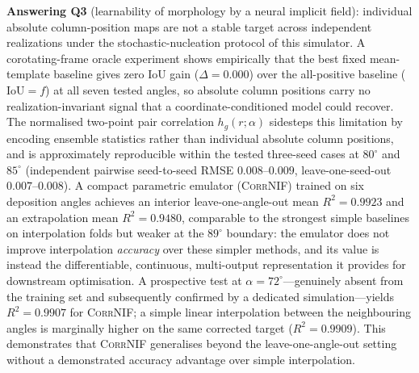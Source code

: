 \documentclass[aip,amsmath,amssymb,reprint]{revtex4-1}
\newcommand{\dang}{\ensuremath{\alpha}}
\begin{document}
\textbf{Answering Q3} (learnability of morphology by a neural implicit
field): individual absolute column-position maps are not a stable
target across independent realizations under the stochastic-nucleation
protocol of this simulator.
A corotating-frame oracle experiment shows empirically that the best
fixed mean-template baseline gives zero IoU gain ($\Delta = 0.000$) over the
all-positive baseline ($\mathrm{IoU}=f$) at all seven tested angles, so
absolute column positions carry no realization-invariant signal that a
coordinate-conditioned model could recover.
The normalised two-point pair correlation $h_g(r;\dang)$ sidesteps this
limitation by encoding ensemble statistics rather than individual
absolute column positions, and is approximately reproducible within the
tested three-seed cases at $80^{\circ}$ and $85^{\circ}$ (independent
pairwise seed-to-seed RMSE $0.008$--$0.009$, leave-one-seed-out
$0.007$--$0.008$).
A compact parametric emulator (\textsc{CorrNIF}) trained on six deposition
angles achieves an interior leave-one-angle-out mean $R^2 = 0.9923$ and an
extrapolation mean $R^2 = 0.9480$, comparable to the strongest simple
baselines on interpolation folds but weaker at the $89^{\circ}$ boundary:
the emulator does not improve interpolation \emph{accuracy} over these
simpler methods, and its value is instead the differentiable, continuous,
multi-output representation it provides for downstream optimisation.
A prospective test at $\dang = 72^{\circ}$---genuinely absent from the
training set and subsequently confirmed by a dedicated simulation---yields
$R^2 = 0.9907$ for \textsc{CorrNIF}; a simple linear interpolation between
the neighbouring angles is marginally higher on the same corrected target
($R^2 = 0.9909$).  This demonstrates that \textsc{CorrNIF} generalises
beyond the leave-one-angle-out setting without a demonstrated accuracy
advantage over simple interpolation.
\end{document}
